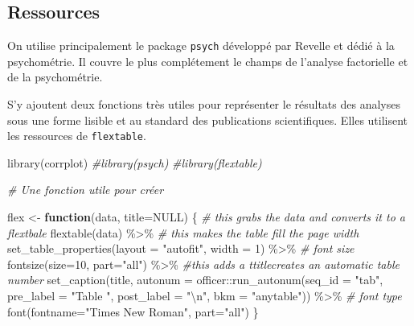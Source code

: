 \documentclass[
]{book}
\newenvironment{Shaded}{\begin{snugshade}}{\end{snugshade}}
\newcommand{\AttributeTok}[1]{\textcolor[rgb]{0.77,0.63,0.00}{#1}}
\newcommand{\CommentTok}[1]{\textcolor[rgb]{0.56,0.35,0.01}{\textit{#1}}}
\newcommand{\ConstantTok}[1]{\textcolor[rgb]{0.00,0.00,0.00}{#1}}
\newcommand{\ControlFlowTok}[1]{\textcolor[rgb]{0.13,0.29,0.53}{\textbf{#1}}}
\newcommand{\DecValTok}[1]{\textcolor[rgb]{0.00,0.00,0.81}{#1}}
\newcommand{\FunctionTok}[1]{\textcolor[rgb]{0.00,0.00,0.00}{#1}}
\newcommand{\NormalTok}[1]{#1}
\newcommand{\OtherTok}[1]{\textcolor[rgb]{0.56,0.35,0.01}{#1}}
\newcommand{\SpecialCharTok}[1]{\textcolor[rgb]{0.00,0.00,0.00}{#1}}
\newcommand{\StringTok}[1]{\textcolor[rgb]{0.31,0.60,0.02}{#1}}
\begin{document}
\hypertarget{ressources}{%
\subsection{Ressources}\label{ressources}}

On utilise principalement le package \texttt{psych} développé par Revelle et dédié à la psychométrie. Il couvre le plus complétement le champs de l'analyse factorielle et de la psychométrie.

S'y ajoutent deux fonctions très utiles pour représenter le résultats des analyses sous une forme lisible et au standard des publications scientifiques. Elles utilisent les ressources de \texttt{flextable}.

\begin{Shaded}
\begin{Highlighting}[]
\FunctionTok{library}\NormalTok{(corrplot)}
\CommentTok{\#library(psych)}
\CommentTok{\#library(flextable)}


\CommentTok{\# Une fonction utile pour créer }


\NormalTok{flex }\OtherTok{\textless{}{-}} \ControlFlowTok{function}\NormalTok{(data, }\AttributeTok{title=}\ConstantTok{NULL}\NormalTok{) \{}
  \CommentTok{\# this grabs the data and converts it to a flextbale}
  \FunctionTok{flextable}\NormalTok{(data) }\SpecialCharTok{\%\textgreater{}\%}
  \CommentTok{\# this makes the table fill the page width}
  \FunctionTok{set\_table\_properties}\NormalTok{(}\AttributeTok{layout =} \StringTok{"autofit"}\NormalTok{, }\AttributeTok{width =} \DecValTok{1}\NormalTok{) }\SpecialCharTok{\%\textgreater{}\%}
  \CommentTok{\# font size}
  \FunctionTok{fontsize}\NormalTok{(}\AttributeTok{size=}\DecValTok{10}\NormalTok{, }\AttributeTok{part=}\StringTok{"all"}\NormalTok{) }\SpecialCharTok{\%\textgreater{}\%}
    \CommentTok{\#this adds a ttitlecreates an automatic table number}
      \FunctionTok{set\_caption}\NormalTok{(title, }
                  \AttributeTok{autonum =}\NormalTok{ officer}\SpecialCharTok{::}\FunctionTok{run\_autonum}\NormalTok{(}\AttributeTok{seq\_id =} \StringTok{"tab"}\NormalTok{, }
                                                 \AttributeTok{pre\_label =} \StringTok{"Table "}\NormalTok{, }
                                                 \AttributeTok{post\_label =} \StringTok{"}\SpecialCharTok{\textbackslash{}n}\StringTok{"}\NormalTok{, }
                                                 \AttributeTok{bkm =} \StringTok{"anytable"}\NormalTok{)) }\SpecialCharTok{\%\textgreater{}\%}
  \CommentTok{\# font type}
  \FunctionTok{font}\NormalTok{(}\AttributeTok{fontname=}\StringTok{"Times New Roman"}\NormalTok{, }\AttributeTok{part=}\StringTok{"all"}\NormalTok{)}
\NormalTok{\}}


\end{Highlighting}
\end{Shaded}
\end{document}
